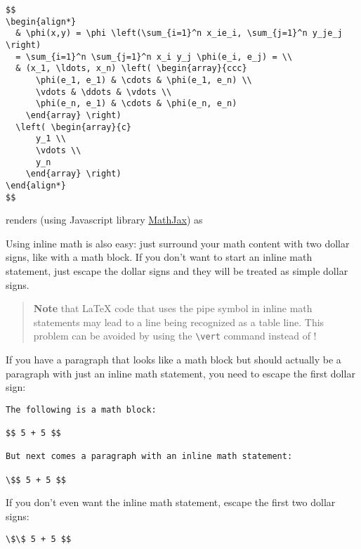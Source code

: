 \documentclass[a4paper]{article}
\begin{document}
\begin{verbatim}
$$
\begin{align*}
  & \phi(x,y) = \phi \left(\sum_{i=1}^n x_ie_i, \sum_{j=1}^n y_je_j \right)
  = \sum_{i=1}^n \sum_{j=1}^n x_i y_j \phi(e_i, e_j) = \\
  & (x_1, \ldots, x_n) \left( \begin{array}{ccc}
      \phi(e_1, e_1) & \cdots & \phi(e_1, e_n) \\
      \vdots & \ddots & \vdots \\
      \phi(e_n, e_1) & \cdots & \phi(e_n, e_n)
    \end{array} \right)
  \left( \begin{array}{c}
      y_1 \\
      \vdots \\
      y_n
    \end{array} \right)
\end{align*}
$$
\end{verbatim}

renders (using Javascript library
\href{http://www.mathjax.org/}{MathJax}) as

Using inline math is also easy: just surround your math content with two
dollar signs, like with a math block. If you don't want to start an
inline math statement, just escape the dollar signs and they will be
treated as simple dollar signs.

\begin{quote}
\textbf{Note} that LaTeX code that uses the pipe symbol
\texttt{\textbar{}} in inline math statements may lead to a line being
recognized as a table line. This problem can be avoided by using the
\texttt{\textbackslash{}vert} command instead of \texttt{\textbar{}}!
\end{quote}

If you have a paragraph that looks like a math block but should actually
be a paragraph with just an inline math statement, you need to escape
the first dollar sign:

\begin{verbatim}
The following is a math block:

$$ 5 + 5 $$

But next comes a paragraph with an inline math statement:

\$$ 5 + 5 $$
\end{verbatim}

If you don't even want the inline math statement, escape the first two
dollar signs:

\begin{verbatim}
\$\$ 5 + 5 $$
\end{verbatim}
\end{document}

